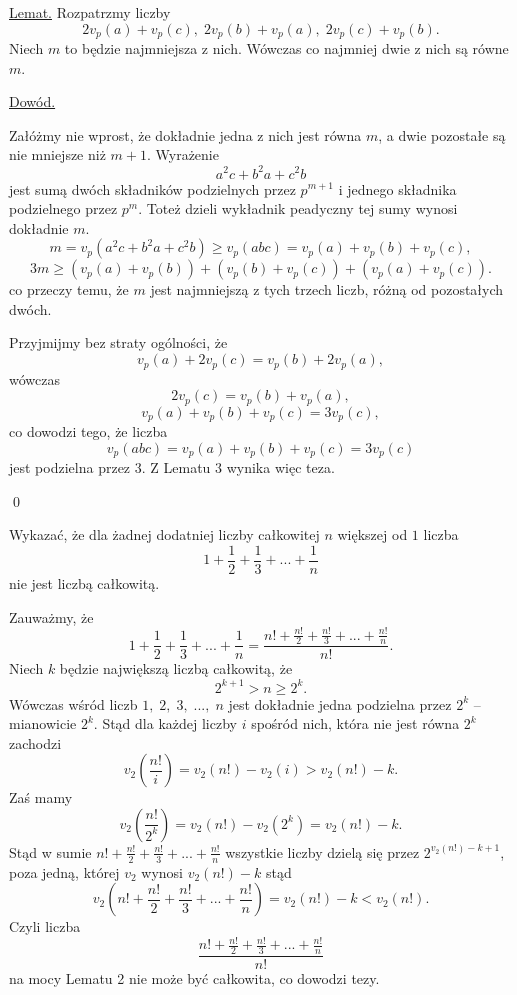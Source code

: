 \vspace{10px}


\noindent
\underline{Lemat.} Rozpatrzmy liczby
\[
	2v_p(a) + v_p(c),\; 2v_p(b) + v_p(a),\; 2v_p(c) + v_p(b).
\] 
Niech $m$ to będzie najmniejsza z nich. Wówczas co najmniej dwie z nich są równe $m$.


\vspace{5px}

\noindent
\underline{Dowód.}

\noindent
Załóżmy nie wprost, że dokładnie jedna z nich jest równa $m$, a dwie pozostałe są nie mniejsze niż $m + 1$. Wyrażenie
\[
	a^2c + b^2a + c^2b
\]
jest sumą dwóch składników podzielnych przez $p^{m + 1}$ i jednego składnika podzielnego przez $p^m$. Toteż dzieli wykładnik peadyczny tej sumy wynosi dokładnie $m$.
\[
	m = v_p(a^2c + b^2a + c^2b) \geqslant v_p(abc) = v_p(a) + v_p(b) + v_p(c),
\]
\[
	3m \geqslant (v_p(a) + v_p(b)) + (v_p(b) + v_p(c)) + (v_p(a)  + v_p(c)).
\]
co przeczy temu, że $m$ jest najmniejszą z tych trzech liczb, różną od pozostałych dwóch.

\vspace{15px}

\noindent
Przyjmijmy bez straty ogólności, że
\[
	v_p(a) + 2v_p(c) = v_p(b) + 2v_p(a),
\]
wówczas
\[
	2v_p(c) = v_p(b) + v_p(a),
\]
\[
	v_p(a) + v_p(b) + v_p(c) = 3v_p(c),
\]
co dowodzi tego, że liczba
\[
	v_p(abc) = v_p(a) + v_p(b) + v_p(c) = 3v_p(c)
\]
jest podzielna przez $3$. Z Lematu $3$ wynika więc teza. 

\qed



\vspace{10px}


\noindent
Wykazać, że dla żadnej dodatniej liczby całkowitej $n$ większej od $1$ liczba
\[
	1 + \frac{1}{2} + \frac{1}{3} + ... + \frac{1}{n}
\]
nie jest liczbą całkowitą.

\vspace{5px}


\noindent
Zauważmy, że
\[
	1 + \frac{1}{2} + \frac{1}{3} + ... + \frac{1}{n} = \frac{n! + \frac{n!}{2} + \frac{n!}{3} + ... + \frac{n!}{n}}{n!}.
\]
Niech $k$ będzie największą liczbą całkowitą, że
\[
	2^{k + 1} > n \geqslant 2^k.
\]
Wówczas wśród liczb $1,\; 2,\; 3,\; ..., \; n$ jest dokładnie jedna podzielna przez $2^{k}$ -- mianowicie $2^{k}$. Stąd dla każdej liczby $i$ spośród nich, która nie jest równa $2^k$ zachodzi
\[
	v_2\left(\frac{n!}{i}\right) = v_2(n!) - v_2(i) > v_2(n!) - k.
\]
Zaś mamy
\[
	v_2\left(\frac{n!}{2^k}\right) = v_2(n!) - v_2(2^k) = v_2(n!) - k.
\]
Stąd w sumie $n! + \frac{n!}{2} + \frac{n!}{3} + ... + \frac{n!}{n}$ wszystkie liczby dzielą się przez $2^{v_2(n!) - k + 1}$, poza jedną, której $v_2$ wynosi $v_2(n!) - k$ stąd
\[
	v_2\left(n! + \frac{n!}{2} + \frac{n!}{3} + ... + \frac{n!}{n}\right) = v_2(n!) - k < v_2(n!).
\]
Czyli liczba
\[
	\frac{n! + \frac{n!}{2} + \frac{n!}{3} + ... + \frac{n!}{n}}{n!}
\]
na mocy Lematu 2 nie może być całkowita, co dowodzi tezy.

